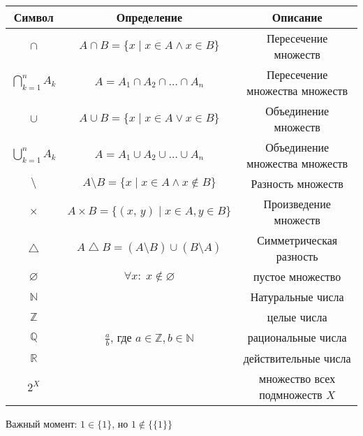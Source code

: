 \begin{center}
  \renewcommand{\arraystretch}{1.7}
  \large
  \begin{tabular}{| c | c | c |}
    \hline
    \textbf{Символ} & \textbf{Определение} & \textbf{Описание}\\
    \hline
    {\Large $\cap$} & $A \cap B = \{ x \mid x \in A \land x \in B\}$ & Пересечение множеств\\
    \hline
    {\Large $\bigcap_{k=1}^n A_k$} & $A = A_1 \cap A_2 \cap \ldots \cap A_n$ & Пересечение множества множеств \\
    \hline
    {\Large $\cup$} & $A \cup B = \{ x \mid x \in A \lor x \in B\}$ & Объединение множеств\\
    \hline
    {\Large $\bigcup_{k=1}^n A_k$} & $A = A_1 \cup A_2 \cup \ldots \cup A_n$ & Объединение множества множеств \\
    \hline
    {\Large $\setminus$} & $A \setminus B = \{ x \mid x \in A \land x \notin B\}$ & Разность множеств\\
    \hline
    {\Large $\times$} & $A \times B = \{ (x,\,y) \mid x \in A, y \in B\}$ & Произведение множеств\\
    \hline
    {\Large $\bigtriangleup$} & $A \bigtriangleup B = (A \setminus B) \cup (B \setminus A)$ & Симметрическая разность\\
    \hline
    {\Large $\varnothing$} & $\forall x: \; x \notin \varnothing$ & пустое множество\\ 
    \hline
    {\Large $\mathbb{N}$} & & Натуральные числа\\
    \hline
    {\Large $\mathbb{Z}$} & & целые числа \\
    \hline
    {\Large $\mathbb{Q}$} & $\frac{a}{b}$, где $a \in \mathbb{Z}, b \in \mathbb{N}$ & рациональные числа \\
    \hline
    {\Large $\mathbb{R}$} & & действительные числа \\
    \hline
    {\Large $2^X$} & & множество всех подмножеств $X$ \\
    \hline
  \end{tabular}
\end{center}
\bigskip

Важный момент: $1 \in \{1\}$, но  $1 \notin\{\{1\}\}$ 

